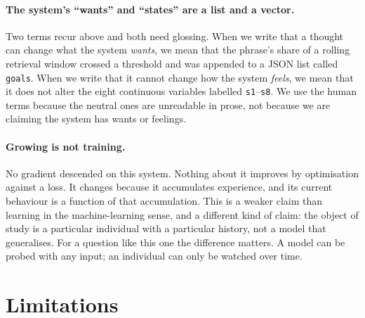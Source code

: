 \documentclass[11pt]{article}
\begin{document}
\paragraph{The system's ``wants'' and ``states'' are a list and a vector.}
Two terms recur above and both need glossing. When we write that a thought can change what the system \emph{wants}, we mean that the phrase's share of a rolling retrieval window crossed a threshold and was appended to a JSON list called \texttt{goals}. When we write that it cannot change how the system \emph{feels}, we mean that it does not alter the eight continuous variables labelled \texttt{s1}--\texttt{s8}. We use the human terms because the neutral ones are unreadable in prose, not because we are claiming the system has wants or feelings.

\paragraph{Growing is not training.}
No gradient descended on this system. Nothing about it improves by optimisation against a loss. It changes because it accumulates experience, and its current behaviour is a function of that accumulation. This is a weaker claim than learning in the machine-learning sense, and a different kind of claim: the object of study is a particular individual with a particular history, not a model that generalises. For a question like this one the difference matters. A model can be probed with any input; an individual can only be watched over time.

\section{Limitations}
\end{document}
